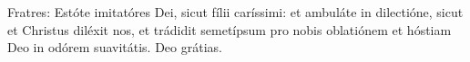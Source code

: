 Fratres: Estóte imitatóres Dei, sicut fílii caríssimi: et ambuláte in dilectióne, sicut et Christus diléxit nos, et trádidit semetípsum pro nobis oblatiónem et hóstiam Deo in odórem suavitátis. \rubric{\Rbar} Deo grátias.
